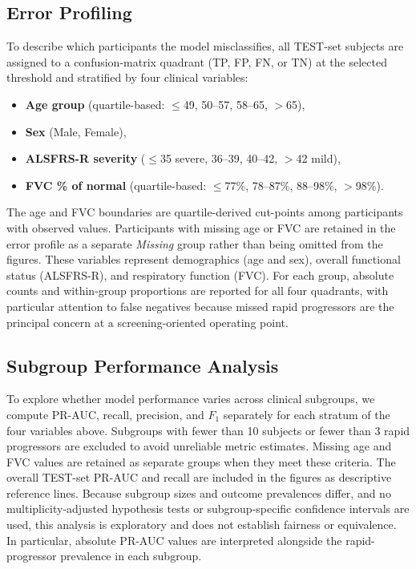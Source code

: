 \subsection{Error Profiling}
\label{subsec:methods_error_profile}
To describe which participants the model misclassifies, all \gls{TEST}-set subjects are assigned to a confusion-matrix quadrant (\gls{TP}, \gls{FP}, \gls{FN}, or \gls{TN}) at the selected threshold and stratified by four clinical variables:
\begin{itemize}
  \item \textbf{Age group} (quartile-based: $\leq$49, 50--57, 58--65, $>$65),
  \item \textbf{Sex} (Male, Female),
  \item \textbf{\gls{ALSFRS-R} severity} ($\leq$35 severe, 36--39, 40--42, $>$42 mild),
  \item \textbf{\gls{FVC} \% of normal} (quartile-based: $\leq$77\%, 78--87\%, 88--98\%, $>$98\%).
\end{itemize}
The age and \gls{FVC} boundaries are quartile-derived cut-points among participants with observed values.
Participants with missing age or \gls{FVC} are retained in the error profile as a separate \textit{Missing} group rather than being omitted from the figures.
These variables represent demographics (age and sex), overall functional status (\gls{ALSFRS-R}), and respiratory function (\gls{FVC}).
For each group, absolute counts and within-group proportions are reported for all four quadrants, with particular attention to false negatives because missed rapid progressors are the principal concern at a screening-oriented operating point.

\subsection{Subgroup Performance Analysis}
\label{subsec:methods_subgroup}
To explore whether model performance varies across clinical subgroups, we compute \gls{PR-AUC}, recall, precision, and $F_1$ separately for each stratum of the four variables above.
Subgroups with fewer than 10 subjects or fewer than 3 rapid progressors are excluded to avoid unreliable metric estimates.
Missing age and \gls{FVC} values are retained as separate groups when they meet these criteria.
The overall \gls{TEST}-set \gls{PR-AUC} and recall are included in the figures as descriptive reference lines.
Because subgroup sizes and outcome prevalences differ, and no multiplicity-adjusted hypothesis tests or subgroup-specific confidence intervals are used, this analysis is exploratory and does not establish fairness or equivalence.
In particular, absolute \gls{PR-AUC} values are interpreted alongside the rapid-progressor prevalence in each subgroup.

